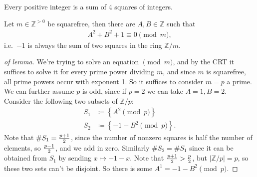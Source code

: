 \begin{theorem}

Every positive integer is a sum of 4 squares of integers.

\end{theorem}

\begin{lemma}

Let \(m \in {\mathbb{Z}}^{>0}\) be squarefree, then there are
\(A, B \in {\mathbb{Z}}\) such that
\begin{align*}
A^2 + B^2 + 1 \equiv 0 \pmod m
,\end{align*}
i.e.~\(-1\) is always the sum of two squares in the ring
\({\mathbb{Z}}/m\).

\end{lemma}

\begin{proof}[of lemma]

We're trying to solve an equation \(\pmod m\), and by the CRT it
suffices to solve it for every prime power dividing \(m\), and since
\(m\) is squarefree, all prime powers occur with exponent 1. So it
suffices to consider \(m=p\) a prime. We can further assume \(p\) is
odd, since if \(p=2\) we can take \(A=1, B=2\). Consider the following
two subsets of \({\mathbb{Z}}/p\):
\begin{align*}
S_1 &\coloneqq\left\{{ A^2 \pmod p }\right\} \\
S_2 &\coloneqq\left\{{ -1-B^2 \pmod p }\right\} 
.\end{align*}
Note that \(\# S_1 = {p+1 \over 2}\), since the number of nonzero
squares is half the number of elements, so \({p-1\over 2}\), and we add
in zero. Similarly \(\# S_2 = \# S_1\) since it can be obtained from
\(S_1\) by sending \(x\mapsto -1-x\). Note that
\({p+1\over 2} > {p\over 2}\), but
\({\left\lvert {{\mathbb{Z}}/p} \right\rvert} = p\), so these two sets
can't be disjoint. So there is some \(A^1 = -1-B^2 \pmod p\).

\end{proof}

